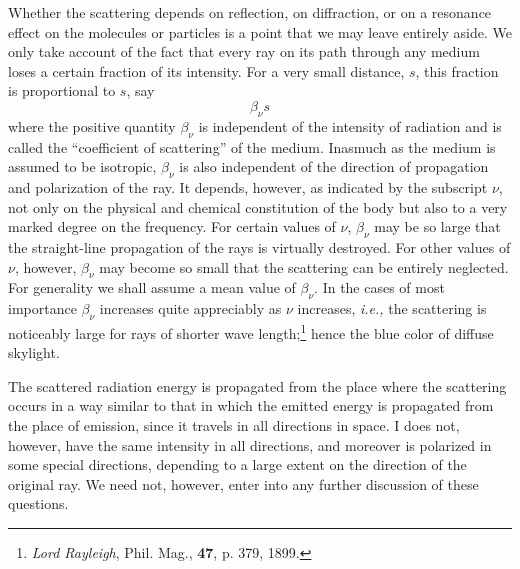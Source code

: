 \documentclass[12pt,oneside]{book}
\begin{document}
Whether the scattering depends on reflection, on diffraction, or on a resonance effect on the molecules or particles is a point that we may leave entirely aside. We only take account of the fact that every ray on its path through any medium loses a certain fraction of its intensity. For a very small distance, $s$, this fraction is proportional to $s$, say
\begin{equation}
    \beta_\nu s
    \label{eq3}
\end{equation}
where the positive quantity $\beta_\nu$ is independent of the intensity of radiation and is called the ``coefficient of scattering'' of the medium. Inasmuch as the medium is assumed to be isotropic, $\beta_\nu$ is also independent of the direction of propagation and polarization of the ray. It depends, however, as indicated by the subscript $\nu$, not only on the physical and chemical constitution of the body but also to a very marked degree on the frequency. For certain values of $\nu$, $\beta_\nu$ may be so large that the straight-line propagation of the rays is virtually destroyed. For other values of $\nu$, however, $\beta_\nu$ may become so small that the scattering can be entirely neglected. For generality we shall assume a mean value of $\beta_\nu$. In the cases of most importance $\beta_\nu$ increases quite appreciably as $\nu$ increases, \textit{i.e.,} the scattering is noticeably large for rays of shorter wave length;\footnote{\textit{Lord Rayleigh}, Phil. Mag., \textbf{47}, p. 379, 1899.} hence the blue color of diffuse skylight. \par 

The scattered radiation energy is propagated from the place where the scattering occurs in a way similar to that in which the emitted energy is propagated from the place of emission, since it travels in all directions in space. I does not, however, have the same intensity in all directions, and moreover is polarized in some special directions, depending to a large extent on the direction of the original ray. We need not, however, enter into any further discussion of these questions. \par 
\end{document}
